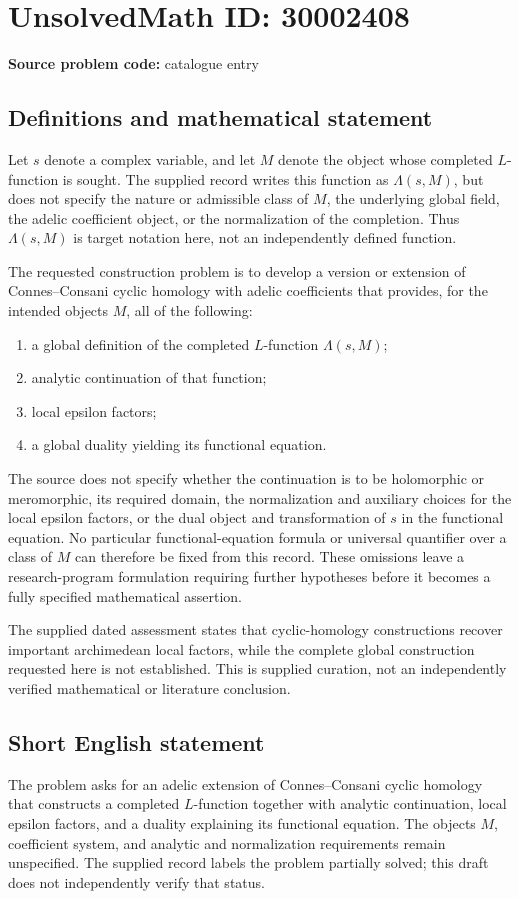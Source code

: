 \documentclass[11pt]{article}
\begin{document}
\section*{UnsolvedMath ID: 30002408}
\textbf{Source problem code:} catalogue entry
\subsection{Definitions and mathematical statement}
Let \(s\) denote a complex variable, and let \(M\) denote the object whose completed \(L\)-function is sought. The supplied record writes this function as \(\Lambda(s,M)\), but does not specify the nature or admissible class of \(M\), the underlying global field, the adelic coefficient object, or the normalization of the completion. Thus \(\Lambda(s,M)\) is target notation here, not an independently defined function.

The requested construction problem is to develop a version or extension of Connes--Consani cyclic homology with adelic coefficients that provides, for the intended objects \(M\), all of the following:
\begin{enumerate}
\item a global definition of the completed \(L\)-function \(\Lambda(s,M)\);
\item analytic continuation of that function;
\item local epsilon factors;
\item a global duality yielding its functional equation.
\end{enumerate}
The source does not specify whether the continuation is to be holomorphic or meromorphic, its required domain, the normalization and auxiliary choices for the local epsilon factors, or the dual object and transformation of \(s\) in the functional equation. No particular functional-equation formula or universal quantifier over a class of \(M\) can therefore be fixed from this record. These omissions leave a research-program formulation requiring further hypotheses before it becomes a fully specified mathematical assertion.

The supplied dated assessment states that cyclic-homology constructions recover important archimedean local factors, while the complete global construction requested here is not established. This is supplied curation, not an independently verified mathematical or literature conclusion.
\subsection{Short English statement}
The problem asks for an adelic extension of Connes--Consani cyclic homology that constructs a completed \(L\)-function together with analytic continuation, local epsilon factors, and a duality explaining its functional equation. The objects \(M\), coefficient system, and analytic and normalization requirements remain unspecified. The supplied record labels the problem partially solved; this draft does not independently verify that status.
\end{document}
